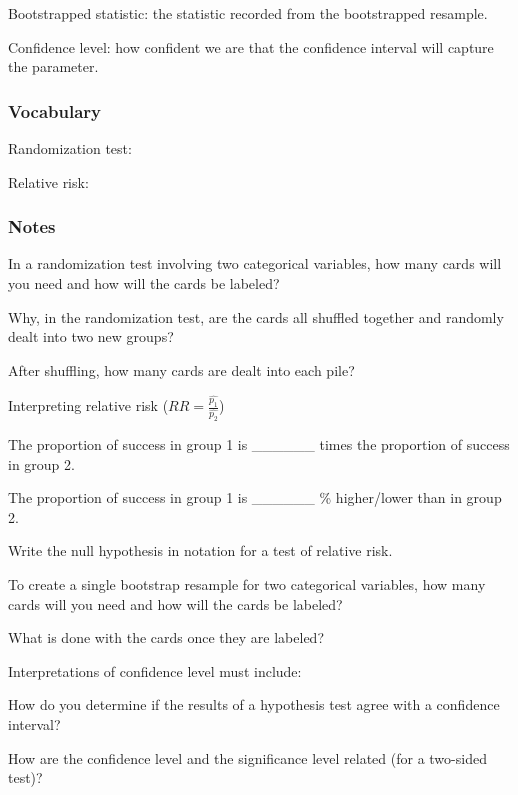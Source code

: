 \documentclass[
]{report}
\newcommand{\rgs}{\vspace{12pt}} %
\newcommand{\rgi}{\hspace{24pt}}  %
\begin{document}
Bootstrapped statistic: the statistic recorded from the bootstrapped resample.

Confidence level: how confident we are that the confidence interval will capture the parameter.

\hypertarget{vocabulary-16}{%
\subsubsection*{Vocabulary}\label{vocabulary-16}}

Randomization test:
\rgs

Relative risk:
\rgs

\hypertarget{notes-20}{%
\subsubsection*{Notes}\label{notes-20}}

In a randomization test involving two categorical variables, how many cards will you need and how will the cards be labeled?
\rgs

Why, in the randomization test, are the cards all shuffled together and randomly dealt into two new groups?
\rgs

After shuffling, how many cards are dealt into each pile?
\rgs

Interpreting relative risk (\(RR = \frac{\hat{p_1}}{\hat{p_2}}\))

\rgi The proportion of success in group 1 is \_\_\_\_\_\_ times the proportion of success in group 2.

\rgi The proportion of success in group 1 is \_\_\_\_\_\_ \% higher/lower than in group 2.

Write the null hypothesis in notation for a test of relative risk.
\rgs

To create a single bootstrap resample for two categorical variables, how many cards will you need and how will the cards be labeled?
\rgs

What is done with the cards once they are labeled?
\rgs

Interpretations of confidence level must include:
\rgs
\rgs

How do you determine if the results of a hypothesis test agree with a confidence interval?
\rgs
\rgs

How are the confidence level and the significance level related (for a two-sided test)?
\rgs
\end{document}
